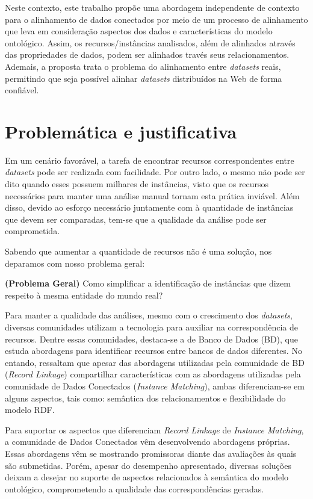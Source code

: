 Neste contexto, este trabalho propõe uma abordagem independente de contexto para o alinhamento de dados conectados por meio de um processo de alinhamento que leva em consideração aspectos dos dados e  características do modelo ontológico. Assim, os recursos/instâncias analisados, além de alinhados através das propriedades de dados, podem ser alinhados través seus relacionamentos. Ademais, a proposta trata o problema do alinhamento entre \textit{datasets} reais, permitindo que seja possível alinhar \textit{datasets} distribuídos na Web de forma confiável.

\section{Problemática e justificativa}
Em um cenário favorável, a tarefa de encontrar recursos correspondentes entre \textit{datasets} pode ser realizada com facilidade. Por outro lado, o mesmo não pode ser dito quando esses  possuem milhares de instâncias, visto que os recursos necessários para manter uma análise manual tornam esta prática inviável. Além disso, devido ao esforço necessário juntamente com à quantidade de instâncias que devem ser comparadas, tem-se que a qualidade da análise pode ser comprometida.

Sabendo que aumentar a quantidade de recursos não é uma solução, nos deparamos com nosso problema geral:

\textbf{(Problema Geral)} Como simplificar a identificação de instâncias que dizem respeito à mesma entidade do mundo real?

Para manter a qualidade das análises, mesmo com o crescimento dos \textit{datasets}, diversas comunidades utilizam a tecnologia para auxiliar na correspondência de recursos. Dentre essas comunidades, destaca-se a de Banco de Dados (BD), que estuda abordagens para identificar recursos entre bancos de dados diferentes. No entando,  ressaltam que apesar das abordagens utilizadas pela comunidade de BD (\textit{Record Linkage}) compartilhar características com as abordagens utilizadas pela comunidade de Dados Conectados (\textit{Instance Matching}), ambas diferenciam-se em alguns aspectos, tais como: semântica dos relacionamentos e flexibilidade do modelo RDF.

Para suportar os aspectos que diferenciam \textit{Record Linkage} de \textit{Instance Matching}, a comunidade de Dados Conectados vêm desenvolvendo abordagens próprias. Essas abordagens vêm se mostrando promissoras diante das avaliações às quais são submetidas. Porém, apesar do desempenho apresentado, diversas soluções deixam a desejar no suporte de aspectos relacionados à semântica do modelo ontológico, comprometendo a qualidade das correspondências geradas.

